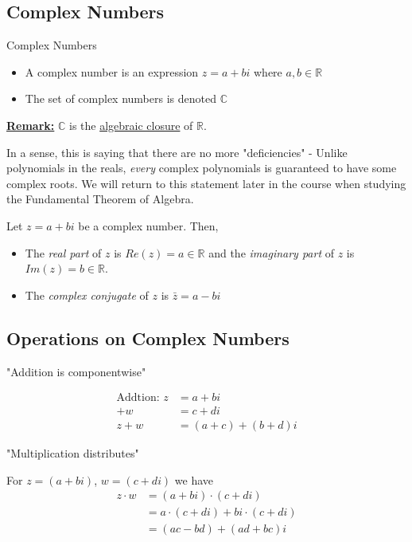 \documentclass{article}
\begin{document}
\subsection{Complex Numbers}

\begin{mathdefinitionbox}{Complex Numbers}
  \begin{itemize}
  \item A complex number is an expression $z = a + bi$ where $a, b \in \mathbb{R}$
  \item The set of complex numbers is denoted $\mathbb{C}$
  \end{itemize}
\end{mathdefinitionbox}
\vskip 0.5cm

\underline{\textbf{Remark:}} $\mathbb{C}$ is the \underline{algebraic closure} of $\mathbb{R}$. 

\vskip 0.5cm
In a sense, this is saying that there are no more "deficiencies" - Unlike polynomials in the reals, \emph{every} complex polynomials is guaranteed to have some complex roots. We will return to this statement later in the course when studying the Fundamental Theorem of Algebra.

\vskip 0.5cm
Let $z = a + bi$ be a complex number. Then, 
\begin{itemize}
  \item The \emph{real part} of $z$ is $Re(z) = a \in \mathbb{R}$ and the \emph{imaginary part} of $z$ is $Im(z) = b \in \mathbb{R}$.
  \item The \emph{complex conjugate} of $z$ is $\bar{z} = a - bi$
\end{itemize} 

\vskip 0.5cm
\subsection{Operations on Complex Numbers}

"Addition is componentwise"

\begin{align*}
  \text{Addtion: } z &= a + bi \\
                  +w &= c + di \\
              z+w&=(a+c) + (b+d)i
\end{align*}

\vskip 0.5cm
"Multiplication distributes"

For $z = (a + bi)$, $w = (c + di)$ we have 
\begin{align*}
  z \cdot w &= (a + bi) \cdot (c + di) \\
            &= a \cdot (c + di) + bi \cdot (c + di) \\
            &= (ac - bd) + (ad + bc)i
\end{align*}
\end{document}

